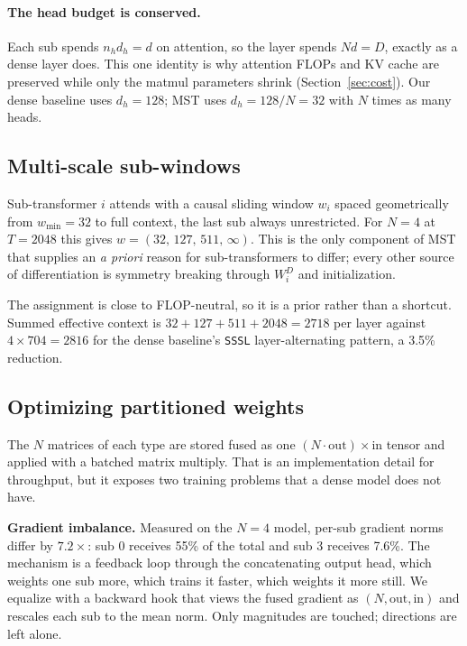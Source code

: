\documentclass{article}
\newcommand{\dmodel}{D}
\newcommand{\dsub}{d}
\newcommand{\nsub}{N}
\begin{document}
\paragraph{The head budget is conserved.} Each sub spends $n_h d_h = \dsub$ on
attention, so the layer spends $\nsub\dsub = \dmodel$, exactly as a dense layer
does. This one identity is why attention FLOPs and KV cache are preserved while
only the matmul parameters shrink (Section~\ref{sec:cost}). Our dense baseline
uses $d_h{=}128$; MST uses $d_h{=}128/\nsub{=}32$ with $\nsub$ times as many heads.

\subsection{Multi-scale sub-windows}
\label{sec:windows}

Sub-transformer $i$ attends with a causal sliding window $w_i$ spaced
geometrically from $w_{\min}{=}32$ to full context, the last sub always
unrestricted. For $\nsub{=}4$ at $T{=}2048$ this gives
$w=(32,\,127,\,511,\,\infty)$. This is the only component of MST that supplies an
\emph{a priori} reason for sub-transformers to differ; every other source of
differentiation is symmetry breaking through $W^{D}_i$ and initialization.

The assignment is close to FLOP-neutral, so it is a prior rather than a shortcut.
Summed effective context is $32+127+511+2048=2718$ per layer against
$4\times704=2816$ for the dense baseline's \texttt{SSSL} layer-alternating
pattern, a 3.5\% reduction.

\subsection{Optimizing partitioned weights}
\label{sec:optim}

The $\nsub$ matrices of each type are stored fused as one
$(\nsub\!\cdot\!\text{out})\times\text{in}$ tensor and applied with a batched
matrix multiply. That is an implementation detail for throughput, but it exposes
two training problems that a dense model does not have.

\textbf{Gradient imbalance.} Measured on the $\nsub{=}4$ model, per-sub gradient
norms differ by $7.2\times$: sub 0 receives 55\% of the total and sub 3 receives
7.6\%. The mechanism is a feedback loop through the concatenating output head,
which weights one sub more, which trains it faster, which weights it more still.
We equalize with a backward hook that views the fused gradient as
$(\nsub,\text{out},\text{in})$ and rescales each sub to the mean norm. Only
magnitudes are touched; directions are left alone.
\end{document}
